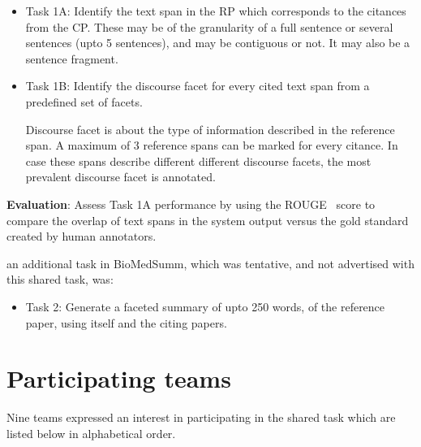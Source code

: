 \documentclass[11pt]{article}
\begin{document}
\begin{itemize}
\item Task 1A: Identify the text span in the RP which corresponds to
  the citances from the CP. These may be of the granularity of a full
  sentence or several sentences (upto 5 sentences), and may be contiguous or not. It may
  also be a sentence fragment.

\item Task 1B: Identify the discourse facet for every cited text span
  from a predefined set of facets.

Discourse facet is about the type of information described in the 
reference span. A maximum of 3 reference spans can be marked for 
every citance. In case these spans describe different different 
discourse facets, the most prevalent discourse facet is annotated.

\end{itemize}
 
{\bf Evaluation}: Assess Task 1A performance by using the
ROUGE~\cite{Lin:2004} score to compare the overlap of text spans in
the system output versus the gold standard created by human
annotators.

an additional task in BioMedSumm, which was tentative, and not advertised with this shared task, was:
\begin{itemize}
\item Task 2: Generate a faceted summary of upto 250 words, of the reference paper, using itself and the citing papers.
\end{itemize}
\section{Participating teams}
Nine teams expressed an interest in participating in the shared task
which are listed below in alphabetical order.
\end{document}
